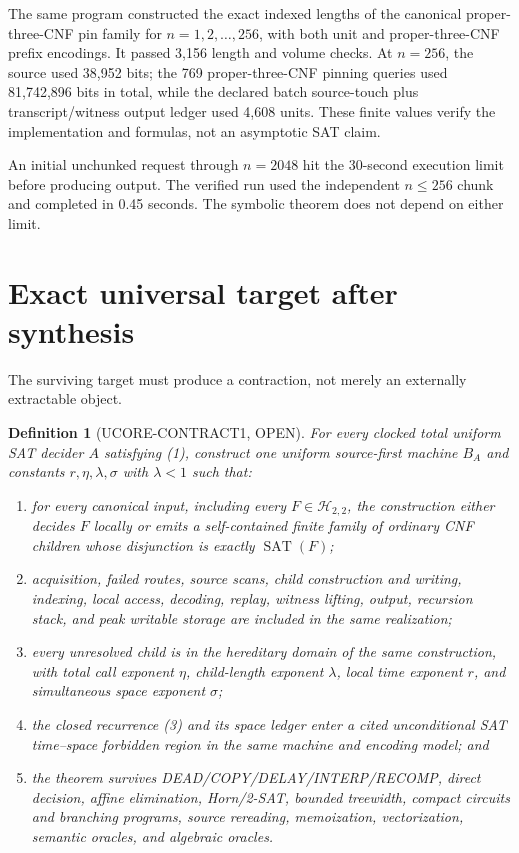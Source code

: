 \documentclass[11pt]{article}
\newtheorem{definition}{Definition}
\begin{document}
The same program constructed the exact indexed lengths of the canonical
proper-three-CNF pin family for $n=1,2,\ldots,256$, with both unit and
proper-three-CNF prefix encodings.  It passed 3,156 length and volume checks.
At $n=256$, the source used 38,952 bits; the 769 proper-three-CNF pinning
queries used 81,742,896 bits in total, while the declared batch source-touch
plus transcript/witness output ledger used 4,608 units.  These finite values
verify the implementation and formulas, not an asymptotic SAT claim.

An initial unchunked request through $n=2048$ hit the 30-second execution
limit before producing output.  The verified run used the independent
$n\le256$ chunk and completed in 0.45 seconds.  The symbolic theorem does not
depend on either limit.

\section{Exact universal target after synthesis}
The surviving target must produce a contraction, not merely an externally
extractable object.

\begin{definition}[UCORE-CONTRACT1, OPEN]
For every clocked total uniform SAT decider $A$ satisfying (1), construct one
uniform source-first machine $B_A$ and constants
$r,\eta,\lambda,\sigma$ with $\lambda<1$ such that:
\begin{enumerate}
\item for every canonical input, including every
$F\in\mathcal H_{2,2}$, the construction either decides $F$ locally or emits
a self-contained finite family of ordinary CNF children whose disjunction is
exactly $\operatorname{SAT}(F)$;
\item acquisition, failed routes, source scans, child construction and
writing, indexing, local access, decoding, replay, witness lifting, output,
recursion stack, and peak writable storage are included in the same
realization;
\item every unresolved child is in the hereditary domain of the same
construction, with total call exponent $\eta$, child-length exponent
$\lambda$, local time exponent $r$, and simultaneous space exponent
$\sigma$;
\item the closed recurrence (3) and its space ledger enter a cited
unconditional SAT time--space forbidden region in the same machine and
encoding model; and
\item the theorem survives DEAD/COPY/DELAY/INTERP/RECOMP, direct decision,
affine elimination, Horn/2-SAT, bounded treewidth, compact circuits and
branching programs, source rereading, memoization, vectorization, semantic
oracles, and algebraic oracles.
\end{enumerate}
\end{definition}
\end{document}
